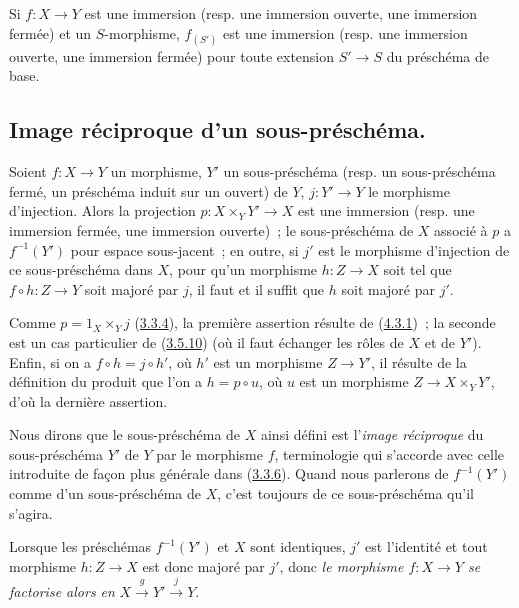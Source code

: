 \begin{corollary}[4.3.2]
\label{I.4.3.2-fr}
Si $f:X\to Y$ est une immersion (resp. une immersion ouverte, une immersion
fermée) et un $S$-morphisme, $f_{(S')}$ est une immersion (resp. une immersion
ouverte, une immersion fermée) pour toute extension $S'\to S$ du préschéma de
base.
\end{corollary}

\subsection{Image réciproque d'un sous-préschéma.}
\label{subsection:I.4.4-fr}

\begin{proposition}[4.4.1]
\label{I.4.4.1-fr}
Soient $f:X\to Y$ un morphisme, $Y'$ un sous-préschéma (resp. un
sous-préschéma fermé, un préschéma induit sur un ouvert) de $Y$, $j:Y'\to Y$
le morphisme d'injection. Alors la projection $p:X\times_Y Y'\to X$ est une
immersion (resp. une immersion fermée, une immersion ouverte)~; le
sous-préschéma de $X$ associé à $p$ a $f^{-1}(Y')$ pour espace sous-jacent~;
en outre, si $j'$ est le morphisme d'injection de ce sous-préschéma dans $X$,
pour qu'un morphisme $h:Z\to X$ soit tel que $f\circ h:Z\to Y$ soit majoré
par $j$, il faut et il suffit que $h$ soit majoré par $j'$.
\end{proposition}

Comme $p=1_X\times_Y j$ (\hyperref[I.3.3.4-fr]{3.3.4}), la première assertion
résulte de (\hyperref[I.4.3.1-fr]{4.3.1})~; la seconde est un cas particulier
de (\hyperref[I.3.5.10-fr]{3.5.10}) (où il faut échanger les rôles de $X$ et
de $Y'$). Enfin, si on a $f\circ h=j\circ h'$, où $h'$ est un morphisme
$Z\to Y'$, il résulte de la définition du produit que l'on a $h=p\circ u$,
où $u$ est un morphisme $Z\to X\times_Y Y'$, d'où la dernière assertion.

Nous dirons que le sous-préschéma de $X$ ainsi défini est l'\emph{image
réciproque} du sous-préschéma $Y'$ de $Y$ par le morphisme $f$, terminologie
qui s'accorde avec celle introduite
de façon plus générale dans (\hyperref[I.3.3.6-fr]{3.3.6}). Quand nous
parlerons de $f^{-1}(Y')$ comme d'un sous-préschéma de $X$, c'est toujours de
ce sous-préschéma qu'il s'agira.

Lorsque les préschémas $f^{-1}(Y')$ et $X$ sont identiques, $j'$ est
l'identité et tout morphisme $h:Z\to X$ est donc majoré par $j'$, donc
\emph{le morphisme $f:X\to Y$ se factorise alors en}
$X\xrightarrow{g}Y'\xrightarrow{j}Y$.

